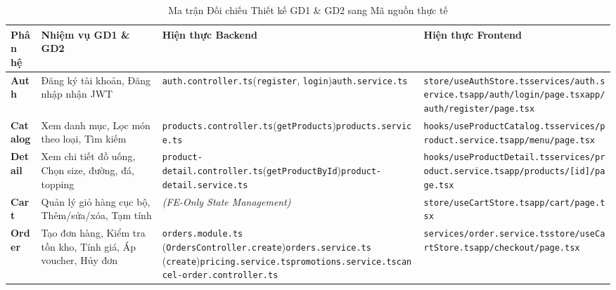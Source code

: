 \begin{table}[htbp]
\centering
\small
\caption{Ma trận Đối chiếu Thiết kế GD1 \& GD2 sang Mã nguồn thực tế}
\label{tab:implementation-matrix}
\begin{tabularx}{\textwidth}{lp{3.2cm}Xp{4.3cm}}
\toprule
\textbf{Phân hệ} & \textbf{Nhiệm vụ GD1 \& GD2} & \textbf{Hiện thực Backend} & \textbf{Hiện thực Frontend} \\
\midrule
\textbf{Auth} & Đăng ký tài khoản, Đăng nhập nhận JWT & \texttt{auth.controller.ts}\newline (\texttt{register}, \texttt{login})\newline \texttt{auth.service.ts} & \texttt{store/useAuthStore.ts}\newline \texttt{services/auth.service.ts}\newline \texttt{app/auth/login/page.tsx}\newline \texttt{app/auth/register/page.tsx} \\
\midrule
\textbf{Catalog} & Xem danh mục, Lọc món theo loại, Tìm kiếm & \texttt{products.controller.ts}\newline (\texttt{getProducts})\newline \texttt{products.service.ts} & \texttt{hooks/useProductCatalog.ts}\newline \texttt{services/product.service.ts}\newline \texttt{app/menu/page.tsx} \\
\midrule
\textbf{Detail} & Xem chi tiết đồ uống, Chọn size, đường, đá, topping & \texttt{product-detail.controller.ts}\newline (\texttt{getProductById})\newline \texttt{product-detail.service.ts} & \texttt{hooks/useProductDetail.ts}\newline \texttt{services/product.service.ts}\newline \texttt{app/products/[id]/page.tsx} \\
\midrule
\textbf{Cart} & Quản lý giỏ hàng cục bộ, Thêm/sửa/xóa, Tạm tính & \textit{(FE-Only State Management)} & \texttt{store/useCartStore.ts}\newline \texttt{app/cart/page.tsx} \\
\midrule
\textbf{Order} & Tạo đơn hàng, Kiểm tra tồn kho, Tính giá, Áp voucher, Hủy đơn & \texttt{orders.module.ts} (\texttt{OrdersController.create})\newline \texttt{orders.service.ts} (\texttt{create})\newline \texttt{pricing.service.ts}\newline \texttt{promotions.service.ts}\newline \texttt{cancel-order.controller.ts} & \texttt{services/order.service.ts}\newline \texttt{store/useCartStore.ts}\newline \texttt{app/checkout/page.tsx} \\

\end{tabularx}
\end{table}

